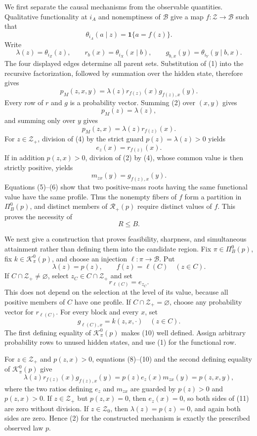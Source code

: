 We first separate the causal mechanisms from the observable quantities.
Qualitative functionality at \(i_A\) and nonemptiness of
\(\mathcal B\) give a map \(f:\mathcal Z\to\mathcal B\) such that
\[
 \theta_{i_A}(a\mid z)=\mathbf 1\{a=f(z)\}.
\tag{1}
\]
Write
\[
 \lambda(z)=\theta_{i_Z}(z),\qquad
 r_b(x)=\theta_{i_X}(x\mid b),\qquad
 g_{b,x}(y)=\theta_{i_Y}(y\mid b,x).
\]
The four displayed edges determine all parent sets.  Substitution of
(1) into the recursive factorization, followed by summation over the
hidden state, therefore gives
\[
 p_M(z,x,y)=\lambda(z)r_{f(z)}(x)g_{f(z),x}(y).
\tag{2}
\]
Every row of \(r\) and \(g\) is a probability vector.  Summing (2) over
\((x,y)\) gives
\[
 p_M(z)=\lambda(z),
\tag{3}
\]
and summing only over \(y\) gives
\[
 p_M(z,x)=\lambda(z)r_{f(z)}(x).
\tag{4}
\]
For \(z\in\mathcal Z_+\), division of (4) by the strict guard
\(p(z)=\lambda(z)>0\) yields
\[
 e_z(x)=r_{f(z)}(x).
\tag{5}
\]
If in addition \(p(z,x)>0\), division of (2) by (4), whose common value
is then strictly positive, yields
\[
 m_{zx}(y)=g_{f(z),x}(y).
\tag{6}
\]
Equations (5)--(6) show that two positive-mass roots having the same
functional value have the same profile.  Thus the nonempty fibers of
\(f\) form a partition in \(\Pi_B^0(p)\), and distinct members of
\(\mathcal R_+(p)\) require distinct values of \(f\).  This proves the
necessity of
\[
 R\leq B.
\tag{7}
\]

We next give a construction that proves feasibility, sharpness, and
simultaneous attainment rather than defining them into the candidate
region.  Fix \(\pi\in\Pi_B^0(p)\), fix
\(k\in\mathcal K_\pi^0(p)\), and choose an injection
\(\ell:\pi\to\mathcal B\).  Put
\[
 \lambda(z)=p(z),\qquad f(z)=\ell(C)\quad(z\in C).
\tag{8}
\]
If \(C\cap\mathcal Z_+\ne\varnothing\), select
\(z_C\in C\cap\mathcal Z_+\) and set
\[
 r_{\ell(C)}=e_{z_C}.
\tag{9}
\]
This does not depend on the selection at the level of its value, because
all positive members of \(C\) have one profile.  If
\(C\cap\mathcal Z_+=\varnothing\), choose any probability vector for
\(r_{\ell(C)}\).  For every block and every \(x\), set
\[
 g_{\ell(C),x}=k(z,x,\cdot)\quad(z\in C).
\tag{10}
\]
The first defining equality of \(\mathcal K_\pi^0(p)\) makes (10)
well defined.  Assign arbitrary probability rows to unused hidden states,
and use (1) for the functional row.

For \(z\in\mathcal Z_+\) and \(p(z,x)>0\), equations (8)--(10) and the
second defining equality of \(\mathcal K_\pi^0(p)\) give
\[
 \lambda(z)r_{f(z)}(x)g_{f(z),x}(y)
 =p(z)e_z(x)m_{zx}(y)=p(z,x,y),
\tag{11}
\]
where the two ratios defining \(e_z\) and \(m_{zx}\) are guarded by
\(p(z)>0\) and \(p(z,x)>0\).  If \(z\in\mathcal Z_+\) but
\(p(z,x)=0\), then \(e_z(x)=0\), so both sides of (11) are zero without
division.  If \(z\in\mathcal Z_0\), then \(\lambda(z)=p(z)=0\), and
again both sides are zero.  Hence (2) for the constructed mechanism is
exactly the prescribed observed law \(p\).

